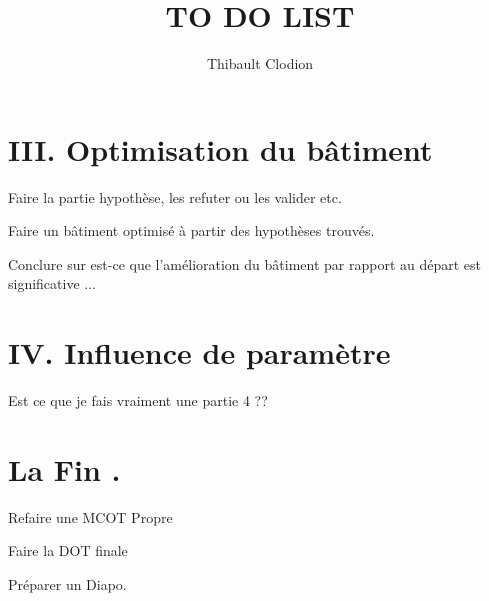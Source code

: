 \documentclass{article}
\title{TO DO LIST}
\author{Thibault Clodion}
\begin{document}
\maketitle %


\section{III. Optimisation du bâtiment}

\begin{todolist}
    \item Faire la partie hypothèse, les refuter ou les valider etc.
    \item Faire un bâtiment optimisé à partir des hypothèses trouvés.
    \item Conclure sur est-ce que l'amélioration du bâtiment par rapport au départ est significative ...
\end{todolist}

\section{IV. Influence de paramètre}
\begin{todolist}
    \item Est ce que je fais vraiment une partie 4 ??
\end{todolist}

\section{La Fin .}

\begin{todolist}
    \item Refaire une MCOT Propre
    \item Faire la DOT finale
    \item Préparer un Diapo.
\end{todolist}
\end{document}
